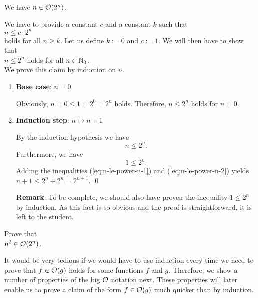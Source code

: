 \example
We have  $n \in \mathcal{O}(2^n)$. 

\proof
We have to provide a constant $c$ and a constant $k$
such that 
\\[0.2cm]
\hspace*{1.3cm}
$ n \leq c \cdot 2^n$ 
\\[0.2cm]
holds for all $n \geq k$.  Let us define $k := 0$ and $c := 1$.  We will then have to show that \\[0.2cm]
\hspace*{1.3cm} $n \leq 2^n$ \quad holds for all $n \in {\mathbb N}_0$.
\\[0.2cm]
We prove this claim by induction on $n$.
\begin{enumerate}
\item \textbf{Base case}: $n = 0$

      Obviously, $n = 0 \leq 1 = 2^0 = 2^n$ holds.  Therefore, $n \leq 2^n$ holds for $n = 0$.
\item \textbf{Induction step}: $n \mapsto n + 1$

      By the induction hypothesis we have 
      \begin{equation}
        \label{eq:n-le-power-n-1}
      n \leq 2^n.    
      \end{equation}
      Furthermore, we have
      \begin{equation}
        \label{eq:n-le-power-n-2}
        1 \leq 2^n.         
      \end{equation}
      Adding the inequalities (\ref{eq:n-le-power-n-1}) and (\ref{eq:n-le-power-n-2}) yields
      \\[0.2cm]
      \hspace*{1.3cm} $n+1 \leq 2^n + 2^n = 2^{n+1}$. \qed

      \textbf{Remark}:  To be complete, we should also have proven the inequality $1 \leq 2^n$ by induction.
      As this fact is so obvious and the proof is straightforward, it is left to the student.
\end{enumerate}

\exercise
Prove that \\[0.2cm]
\hspace*{1.3cm}
 $n^2 \in \mathcal{O}(2^n)$. \eox
\vspace*{0.3cm}


It would be very tedious if we would have to use induction every time we need to prove that 
$f \in \mathcal{O}(g)$ holds for some functions $f$ and $g$.   Therefore, we show a number of properties of
the big $\mathcal{O}$ notation next.  These properties will later enable us to prove a claim of the form 
$f \in \mathcal{O}(g)$ much quicker than by induction.



